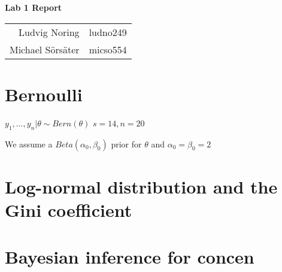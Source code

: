 \documentclass[12pt,a4paper]{article}
\begin{document}
\begin{center}

    \vspace{0.7cm}
    \LARGE
    \textbf{Lab 1 Report}
    \vspace{0.7cm}
    \Large
    \begin{table}[h]
      \centering
      \begin{tabular}{ r l }
      Ludvig Noring & ludno249 \\
      Michael Sörsäter & micso554 \\
      \end{tabular}
    \end{table}

\end{center}

\section{Bernoulli}
$ y_1,\ldots,y_n | \theta \sim Bern(\theta)$
$ s = 14, n = 20$

We assume a $Beta(\alpha_0, \beta_0)$ prior for $\theta$ and $\alpha_0 = \beta_0 = 2$
\section{Log-normal distribution and the Gini coefficient}
\section{Bayesian inference for concen}

%   
\end{document}
